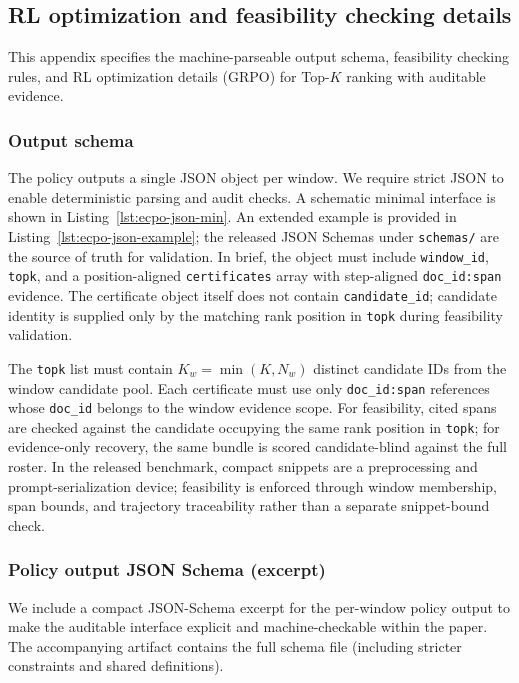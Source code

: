 \documentclass{article}
\begin{document}
\subsection{RL optimization and feasibility checking details}
\label{sec:app_rl}

This appendix specifies the machine-parseable output schema, feasibility checking rules, and RL optimization details (GRPO) for Top-$K$ ranking with auditable evidence.

\subsubsection{Output schema}
\label{sec:app_rl_schema}

The policy outputs a single JSON object per window.
We require strict JSON to enable deterministic parsing and audit checks.
A schematic minimal interface is shown in Listing~\ref{lst:ecpo-json-min}.
An extended example is provided in Listing~\ref{lst:ecpo-json-example}; the released JSON Schemas under \texttt{schemas/} are the source of truth for validation.
In brief, the object must include \texttt{window\_id}, \texttt{topk}, and a position-aligned \texttt{certificates} array with step-aligned \texttt{doc\_id:span} evidence. The certificate object itself does not contain \texttt{candidate\_id}; candidate identity is supplied only by the matching rank position in \texttt{topk} during feasibility validation.

The \texttt{topk} list must contain $K_w=\min(K,N_w)$ distinct candidate IDs from the window candidate pool.
Each certificate must use only \texttt{doc\_id:span} references whose \texttt{doc\_id} belongs to the window evidence scope. For feasibility, cited spans are checked against the candidate occupying the same rank position in \texttt{topk}; for evidence-only recovery, the same bundle is scored candidate-blind against the full roster.
In the released benchmark, compact snippets are a preprocessing and prompt-serialization device; feasibility is enforced through window membership, span bounds, and trajectory traceability rather than a separate snippet-bound check.

\subsubsection{Policy output JSON Schema (excerpt)}
\label{sec:app_rl_output_jsonschema}

We include a compact JSON-Schema excerpt for the per-window policy output to make the auditable interface explicit and machine-checkable within the paper. 
The accompanying artifact contains the full schema file (including stricter constraints and shared definitions).
\end{document}
